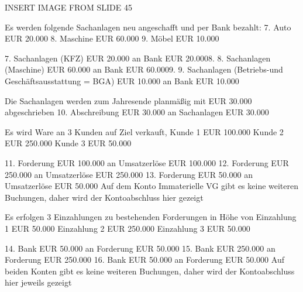 INSERT IMAGE FROM SLIDE 45


Es werden folgende Sachanlagen neu angeschafft und per Bank bezahlt:
7. Auto EUR 20.000
8. Maschine EUR 60.000
9. Möbel EUR 10.000

7. Sachanlagen (KFZ) EUR 20.000 an Bank EUR 20.0008.
8. Sachanlagen (Maschine) EUR 60.000 an Bank EUR 60.0009.
9. Sachanlagen (Betriebs-und Geschäftsausstattung = BGA) EUR 10.000 an Bank EUR 10.000


Die Sachanlagen werden zum Jahresende planmäßig mit EUR 30.000 abgeschrieben
10. Abschreibung EUR 30.000 an Sachanlagen EUR 30.000

Es wird Ware an 3 Kunden auf Ziel verkauft,
Kunde 1 EUR 100.000
Kunde 2 EUR 250.000
Kunde 3 EUR 50.000

11. Forderung EUR 100.000 an Umsatzerlöse EUR 100.000
12. Forderung EUR 250.000 an Umsatzerlöse EUR 250.000
13. Forderung EUR 50.000 an Umsatzerlöse EUR 50.000
Auf dem Konto Immaterielle VG gibt es keine weiteren Buchungen, daher wird der Kontoabschluss hier gezeigt

Es erfolgen 3 Einzahlungen zu bestehenden Forderungen in Höhe von
Einzahlung 1 EUR 50.000
Einzahlung 2 EUR 250.000
Einzahlung 3 EUR 50.000

14. Bank EUR 50.000 an Forderung EUR 50.000
15. Bank EUR 250.000 an Forderung EUR 250.000
16. Bank EUR 50.000 an Forderung EUR 50.000
Auf beiden Konten gibt es keine weiteren Buchungen, daher wird der Kontoabschluss hier jeweils gezeigt



